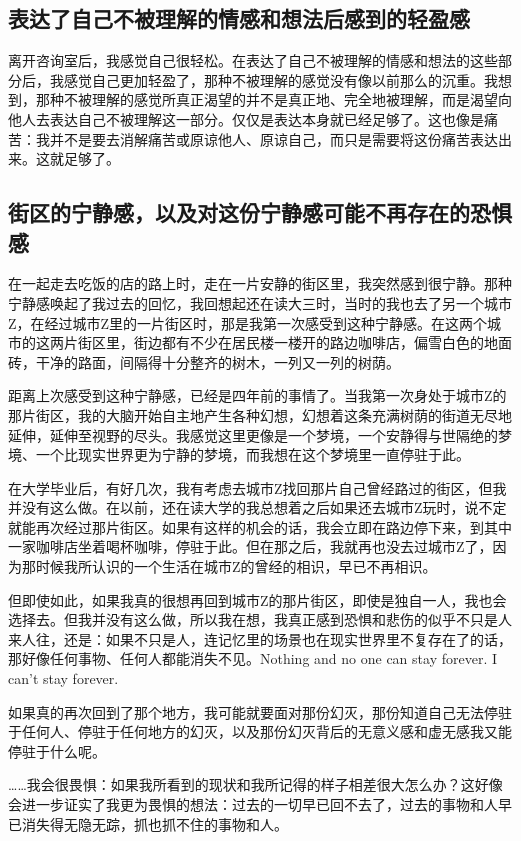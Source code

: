 

\subsection*{表达了自己不被理解的情感和想法后感到的轻盈感}

离开咨询室后，我感觉自己很轻松。在表达了自己不被理解的情感和想法的这些部分后，我感觉自己更加轻盈了，那种不被理解的感觉没有像以前那么的沉重。我想到，那种不被理解的感觉所真正渴望的并不是真正地、完全地被理解，而是渴望向他人去表达自己不被理解这一部分。仅仅是表达本身就已经足够了。这也像是痛苦：我并不是要去消解痛苦或原谅他人、原谅自己，而只是需要将这份痛苦表达出来。这就足够了。



\subsection*{街区的宁静感，以及对这份宁静感可能不再存在的恐惧感}

在一起走去吃饭的店的路上时，走在一片安静的街区里，我突然感到很宁静。那种宁静感唤起了我过去的回忆，我回想起还在读大三时，当时的我也去了另一个城市Z，在经过城市Z里的一片街区时，那是我第一次感受到这种宁静感。在这两个城市的这两片街区里，街边都有不少在居民楼一楼开的路边咖啡店，偏雪白色的地面砖，干净的路面，间隔得十分整齐的树木，一列又一列的树荫。

距离上次感受到这种宁静感，已经是四年前的事情了。当我第一次身处于城市Z的那片街区，我的大脑开始自主地产生各种幻想，幻想着这条充满树荫的街道无尽地延伸，延伸至视野的尽头。我感觉这里更像是一个梦境，一个安静得与世隔绝的梦境、一个比现实世界更为宁静的梦境，而我想在这个梦境里一直停驻于此。

在大学毕业后，有好几次，我有考虑去城市Z找回那片自己曾经路过的街区，但我并没有这么做。在以前，还在读大学的我总想着之后如果还去城市Z玩时，说不定就能再次经过那片街区。如果有这样的机会的话，我会立即在路边停下来，到其中一家咖啡店坐着喝杯咖啡，停驻于此。但在那之后，我就再也没去过城市Z了，因为那时候我所认识的一个生活在城市Z的曾经的相识，早已不再相识。

但即使如此，如果我真的很想再回到城市Z的那片街区，即使是独自一人，我也会选择去。但我并没有这么做，所以我在想，我真正感到恐惧和悲伤的似乎不只是人来人往，还是：如果不只是人，连记忆里的场景也在现实世界里不复存在了的话，那好像任何事物、任何人都能消失不见。Nothing and no one can stay forever. I can't stay forever.

如果真的再次回到了那个地方，我可能就要面对那份幻灭，那份知道自己无法停驻于任何人、停驻于任何地方的幻灭，以及那份幻灭背后的无意义感和虚无感\pozhehao{}我又能停驻于什么呢。

……我会很畏惧：如果我所看到的现状和我所记得的样子相差很大怎么办？这好像会进一步证实了我更为畏惧的想法：过去的一切早已回不去了，过去的事物和人早已消失得无隐无踪，抓也抓不住的事物和人。






